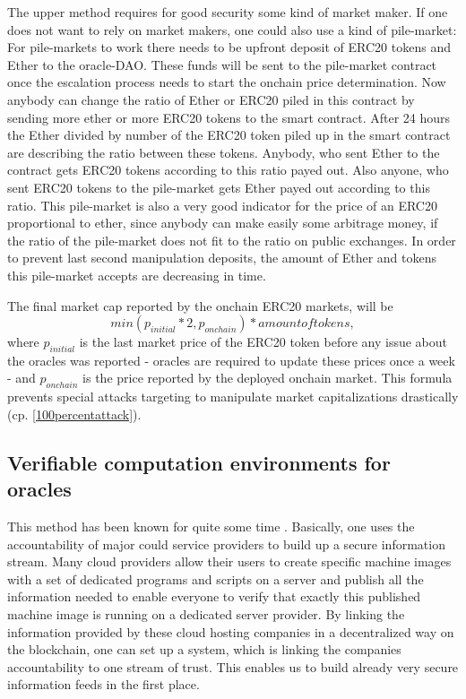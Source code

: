 \documentclass[a4paper]{article}
\begin{document}
The upper method requires for good security some kind of market maker. If one does not want to rely on market makers, one could also use a kind of pile-market:
For pile-markets to work there needs to be upfront deposit of ERC20 tokens and Ether to the oracle-DAO. These funds will be sent to the pile-market contract once the escalation process needs to start the onchain price determination. Now anybody can change the ratio of Ether or ERC20 piled in this contract by sending more ether or more ERC20 tokens to the smart contract. After 24 hours the Ether divided by number of the ERC20 token piled up in the smart contract are describing the ratio between these tokens. Anybody, who sent Ether to the contract gets ERC20 tokens according to this ratio payed out. Also anyone, who sent ERC20 tokens to the pile-market gets Ether payed out according to this ratio. This pile-market is also a very good indicator for the price of an ERC20 proportional to ether, since anybody can make easily some arbitrage money, if the ratio of the pile-market does not fit to the ratio on public exchanges. In order to prevent last second manipulation deposits, the amount of Ether and tokens this pile-market accepts are decreasing in time.

The final market cap reported by the onchain ERC20 markets, will be $$
min(p_{initial}*2, p_{onchain})*amount of tokens, \label{marketpricecap}$$
where $p_{initial}$ is the last market price of the ERC20 token before any issue about the oracles was reported - oracles are required to update these prices once a week - and $p_{onchain}$ is the price reported by the deployed onchain market. This formula prevents special attacks targeting to manipulate market capitalizations drastically (cp. \ref{100percentattack}).
\subsection{ Verifiable computation environments for oracles} \label{oracleserver}

This method has been known for quite some time \cite{oracle}. Basically, one uses the accountability of major could service providers to build up a secure information stream.
Many cloud providers allow their users to create specific machine images with a set of dedicated programs and scripts on a server and publish all the information needed to enable everyone to verify that exactly this published machine image is running on a dedicated server provider. By linking the information provided by these cloud hosting companies in a decentralized way on the blockchain, one can set up a system, which is linking the companies accountability to one stream of trust. This enables us to build already very secure information feeds in the first place.
\end{document}
